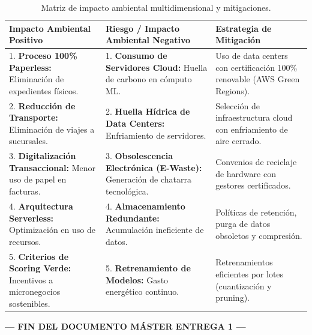 \documentclass[11pt,a4paper]{article}
\begin{document}
\begin{table}[h!]
\centering
\tiny
\begin{tabular}{p{4.5cm} p{5.5cm} p{5.5cm}}
\toprule
\textbf{Impacto Ambiental Positivo} & \textbf{Riesgo / Impacto Ambiental Negativo} & \textbf{Estrategia de Mitigación} \\
\midrule
1. \textbf{Proceso 100\% Paperless:} Eliminación de expedientes físicos. & 1. \textbf{Consumo de Servidores Cloud:} Huella de carbono en cómputo ML. & Uso de data centers con certificación 100\% renovable (AWS Green Regions). \\
\midrule
2. \textbf{Reducción de Transporte:} Eliminación de viajes a sucursales. & 2. \textbf{Huella Hídrica de Data Centers:} Enfriamiento de servidores. & Selección de infraestructura cloud con enfriamiento de aire cerrado. \\
\midrule
3. \textbf{Digitalización Transaccional:} Menor uso de papel en facturas. & 3. \textbf{Obsolescencia Electrónica (E-Waste):} Generación de chatarra tecnológica. & Convenios de reciclaje de hardware con gestores certificados. \\
\midrule
4. \textbf{Arquitectura Serverless:} Optimización en uso de recursos. & 4. \textbf{Almacenamiento Redundante:} Acumulación ineficiente de datos. & Políticas de retención, purga de datos obsoletos y compresión. \\
\midrule
5. \textbf{Criterios de Scoring Verde:} Incentivos a micronegocios sostenibles. & 5. \textbf{Retrenamiento de Modelos:} Gasto energético continuo. & Retrenamientos eficientes por lotes (cuantización y pruning). \\
\bottomrule
\end{tabular}
\caption{Matriz de impacto ambiental multidimensional y mitigaciones.}
\end{table}

\vspace{0.5cm}
\begin{center}
\textbf{--- FIN DEL DOCUMENTO MÁSTER ENTREGA 1 ---}
\end{center}
\end{document}
